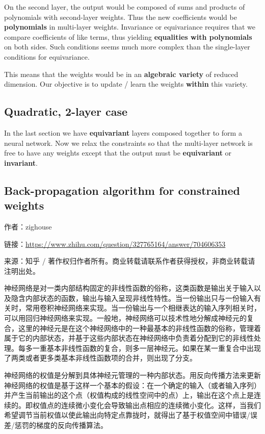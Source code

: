 On the second layer, the output would be composed of sums and products of polynomials with second-layer weights.  Thus the new coefficients would be \textbf{polynomials} in multi-layer weights.  Invariance or equivariance requires that we compare coefficients of like terms, thus yielding \textbf{equalities with polynomials} on both sides.  Such conditions seems much more complex than the single-layer conditions for equivariance.

This means that the weights would be in an \textbf{algebraic variety} of reduced dimension.  Our objective is to update / learn the weights \textbf{within} this variety.  

\subsection{Quadratic, 2-layer case}

In the last section we have \textbf{equivariant} layers composed together to form a neural network.  Now we relax the constraints so that the multi-layer network is free to have any weights except that the output must be \textbf{equivariant} or \textbf{invariant}.

\subsection{Back-propagation algorithm for constrained weights}

作者：zighouse

链接：\url{https://www.zhihu.com/question/327765164/answer/704606353}

{\footnotesize 来源：知乎 / 著作权归作者所有。商业转载请联系作者获得授权，非商业转载请注明出处。}

神经网络是对一类内部结构固定的非线性函数的俗称，这类函数是输出关于输入以及隐含内部状态的函数，输出与输入呈现非线性特性。当一份输出只与一份输入有关时，常用卷积神经网络来实现。当一份输出与一个相继表达的输入序列相关时，可以用回归神经网络来实现。一般地，神经网络可以技术性地分解成神经元的复合，这里的神经元是在这个神经网络中的一种最基本的非线性函数的俗称，管理着属于它的内部状态，并基于这些内部状态在神经网络中负责着分配到它的非线性处理。每多一重基本非线性函数的复合，则多一层神经元。如果在某一重复合中出现了两类或者更多类基本非线性函数项的合并，则出现了分支。

神经网络的权值是分解到具体神经元管理的一种内部状态。用反向传播方法来更新神经网络的权值是基于这样一个基本的假设：在一个确定的输入（或者输入序列）并产生当前输出的这个点（权值构成的线性空间中的点）上，输出在这个点上是连续的。即权值点的连续微小变化会导致输出点相应的连续微小变化。这样，当我们希望调节当前权值以使此输出向特定点靠拢时，就得出了基于权值空间中错误/误差/惩罚的梯度的反向传播算法。

